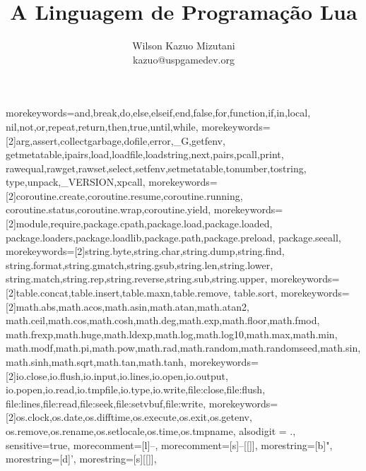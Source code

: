 \documentclass[brazil]{beamer}
\title{A Linguagem de Programação Lua}
\author{Wilson Kazuo Mizutani \\ kazuo@uspgamedev.org}
\begin{document}
  {morekeywords={and,break,do,else,elseif,end,false,for,function,if,in,local,
     nil,not,or,repeat,return,then,true,until,while},
   morekeywords={[2]arg,assert,collectgarbage,dofile,error,_G,getfenv,
     getmetatable,ipairs,load,loadfile,loadstring,next,pairs,pcall,print,
     rawequal,rawget,rawset,select,setfenv,setmetatable,tonumber,tostring,
     type,unpack,_VERSION,xpcall},
   morekeywords={[2]coroutine.create,coroutine.resume,coroutine.running,
     coroutine.status,coroutine.wrap,coroutine.yield},
   morekeywords={[2]module,require,package.cpath,package.load,package.loaded,
     package.loaders,package.loadlib,package.path,package.preload,
     package.seeall},
   morekeywords={[2]string.byte,string.char,string.dump,string.find,
     string.format,string.gmatch,string.gsub,string.len,string.lower,
     string.match,string.rep,string.reverse,string.sub,string.upper},
   morekeywords={[2]table.concat,table.insert,table.maxn,table.remove,
   table.sort},
   morekeywords={[2]math.abs,math.acos,math.asin,math.atan,math.atan2,
     math.ceil,math.cos,math.cosh,math.deg,math.exp,math.floor,math.fmod,
     math.frexp,math.huge,math.ldexp,math.log,math.log10,math.max,math.min,
     math.modf,math.pi,math.pow,math.rad,math.random,math.randomseed,math.sin,
     math.sinh,math.sqrt,math.tan,math.tanh},
   morekeywords={[2]io.close,io.flush,io.input,io.lines,io.open,io.output,
     io.popen,io.read,io.tmpfile,io.type,io.write,file:close,file:flush,
     file:lines,file:read,file:seek,file:setvbuf,file:write},
   morekeywords={[2]os.clock,os.date,os.difftime,os.execute,os.exit,os.getenv,
     os.remove,os.rename,os.setlocale,os.time,os.tmpname},
   alsodigit = {.},
   sensitive=true,
   morecomment=[l]{--},
   morecomment=[s]{--[[}{]]},
   morestring=[b]",
   morestring=[d]',
   morestring=[s]{[[}{]]},
  }


\frame{\titlepage}

\frame{\tableofcontents}

\end{document}
